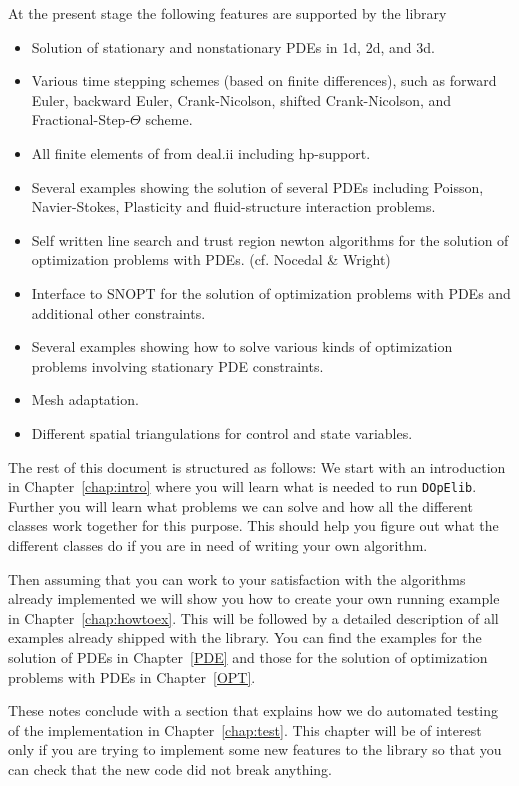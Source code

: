 At the present stage the following features are supported by the library
\begin{itemize}
\item Solution of stationary and nonstationary PDEs in 1d, 2d, and 3d.
\item Various time stepping schemes (based on finite differences), 
  such as forward Euler, backward Euler,
  Crank-Nicolson, shifted Crank-Nicolson, and Fractional-Step-$\Theta$ scheme.
\item All finite elements of from deal.ii including hp-support.
\item Several examples showing the solution of several PDEs including
   Poisson, Navier-Stokes, Plasticity and fluid-structure interaction problems. 
\item Self written line search and trust region newton algorithms for the 
   solution of optimization problems with PDEs. (cf. Nocedal \& Wright)
\item Interface to SNOPT for the solution of optimization problems with PDEs and
  additional other constraints.
\item Several examples showing how to solve various kinds of optimization problems
  involving stationary PDE constraints.
\item Mesh adaptation.
\item Different spatial triangulations for control and state variables.
\end{itemize}
 
The rest of this document is structured as follows: We start with an introduction in
Chapter~\ref{chap:intro} where you will learn what is needed to run {\tt DOpElib}. 
Further you will learn what problems we can solve and how all the different classes 
work together for this purpose. This should help you figure out what the different classes
do if you are in need of writing your own algorithm.

Then assuming that you can work to your satisfaction with the algorithms already implemented
we will show you how to create your own running example in Chapter~\ref{chap:howtoex}.
This will be followed by a detailed description of all examples already shipped with 
the library. You can find the examples for the solution of PDEs in Chapter~\ref{PDE}
and those for the solution of optimization problems with PDEs in Chapter~\ref{OPT}.

These notes conclude with a section that explains how we do automated testing of the 
implementation in Chapter~\ref{chap:test}. This chapter will be of interest only if you 
are trying to implement some new features to the library so that you can check that 
the new code did not break anything.

